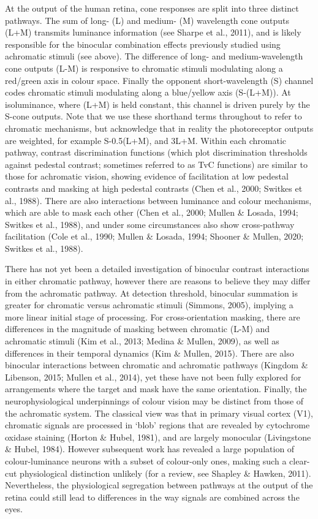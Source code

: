 \documentclass[
  letterpaper,
  DIV=11,
  numbers=noendperiod]{scrartcl}
\begin{document}
At the output of the human retina, cone responses are split into three
distinct pathways. The sum of long- (L) and medium- (M) wavelength cone
outputs (L+M) transmits luminance information (see Sharpe et al., 2011),
and is likely responsible for the binocular combination effects
previously studied using achromatic stimuli (see above). The difference
of long- and medium-wavelength cone outputs (L-M) is responsive to
chromatic stimuli modulating along a red/green axis in colour space.
Finally the opponent short-wavelength (S) channel codes chromatic
stimuli modulating along a blue/yellow axis (S-(L+M)). At isoluminance,
where (L+M) is held constant, this channel is driven purely by the
S-cone outputs. Note that we use these shorthand terms throughout to
refer to chromatic mechanisms, but acknowledge that in reality the
photoreceptor outputs are weighted, for example S-0.5(L+M), and 3L+M.
Within each chromatic pathway, contrast discrimination functions (which
plot discrimination thresholds against pedestal contrast; sometimes
referred to as TvC functions) are similar to those for achromatic
vision, showing evidence of facilitation at low pedestal contrasts and
masking at high pedestal contrasts (Chen et al., 2000; Switkes et al.,
1988). There are also interactions between luminance and colour
mechanisms, which are able to mask each other (Chen et al., 2000; Mullen
\& Losada, 1994; Switkes et al., 1988), and under some circumstances
also show cross-pathway facilitation (Cole et al., 1990; Mullen \&
Losada, 1994; Shooner \& Mullen, 2020; Switkes et al., 1988).

There has not yet been a detailed investigation of binocular contrast
interactions in either chromatic pathway, however there are reasons to
believe they may differ from the achromatic pathway. At detection
threshold, binocular summation is greater for chromatic versus
achromatic stimuli (Simmons, 2005), implying a more linear initial stage
of processing. For cross-orientation masking, there are differences in
the magnitude of masking between chromatic (L-M) and achromatic stimuli
(Kim et al., 2013; Medina \& Mullen, 2009), as well as differences in
their temporal dynamics (Kim \& Mullen, 2015). There are also binocular
interactions between chromatic and achromatic pathways (Kingdom \&
Libenson, 2015; Mullen et al., 2014), yet these have not been fully
explored for arrangements where the target and mask have the same
orientation. Finally, the neurophysiological underpinnings of colour
vision may be distinct from those of the achromatic system. The
classical view was that in primary visual cortex (V1), chromatic signals
are processed in `blob' regions that are revealed by cytochrome oxidase
staining (Horton \& Hubel, 1981), and are largely monocular (Livingstone
\& Hubel, 1984). However subsequent work has revealed a large population
of colour-luminance neurons with a subset of colour-only ones, making
such a clear-cut physiological distinction unlikely (for a review, see
Shapley \& Hawken, 2011). Nevertheless, the physiological segregation
between pathways at the output of the retina could still lead to
differences in the way signals are combined across the eyes.
\end{document}
